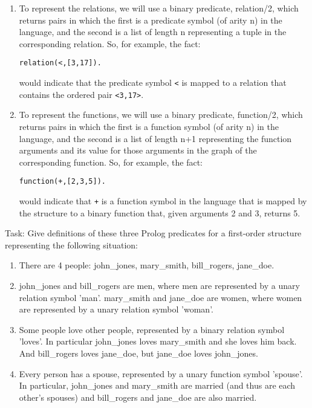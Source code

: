 \begin{enumerate}
\begin{enumerate}
\begin{enumerate}
\item
To represent the relations, we will use a binary predicate,
relation/2, which returns pairs in which the first is a predicate
symbol (of arity n) in the language, and the second is a list of
length n representing a tuple in the corresponding relation.
So, for example, the fact:
\begin{verbatim}
relation(<,[3,17]).
\end{verbatim}
would indicate that the predicate symbol \verb|<| is mapped to a relation
that contains the ordered pair \verb|<3,17>|.

\item
To represent the functions, we will use a binary predicate,
function/2, which returns pairs in which the first is a function
symbol (of arity n) in the language, and the second is a list of
length n+1 representing the function arguments and its value for those
arguments in the graph of the corresponding function.
So, for example, the fact:
\begin{verbatim}
function(+,[2,3,5]).
\end{verbatim}
would indicate that \verb|+| is a function symbol in the language that is
mapped by the structure to a binary function that, given arguments 2
and 3, returns 5.
\end{enumerate}

Task: Give definitions of these three Prolog predicates for a
first-order structure representing the following situation:

\begin{enumerate}
\item
There are 4 people: john\_jones, mary\_smith, bill\_rogers,
jane\_doe.

\item
john\_jones and bill\_rogers are men, where men are represented by a
unary relation symbol 'man'.  mary\_smith and jane\_doe are women, where
women are represented by a unary relation symbol 'woman'.

\item
Some people love other people, represented by a binary relation
symbol 'loves'.  In particular john\_jones loves mary\_smith and she
loves him back.  And bill\_rogers loves jane\_doe, but jane\_doe loves
john\_jones.

\item
Every person has a spouse, represented by a unary function symbol
'spouse'.  In particular, john\_jones and mary\_smith are married (and
thus are each other's spouses) and bill\_rogers and jane\_doe are also
married.
\end{enumerate}


\end{enumerate}
\end{enumerate}
